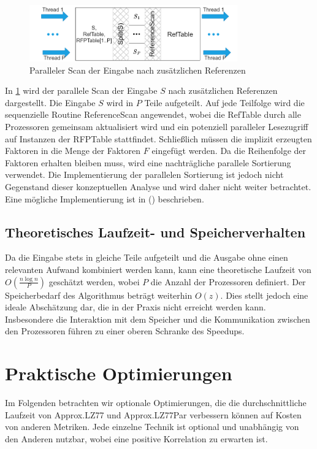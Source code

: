 \begin{figure}[ht]
    \centering
    \includegraphics[width=0.8\textwidth]{Images/parallel_referencescan.png}
    \caption{Paralleler Scan der Eingabe nach zusätzlichen Referenzen}
    \label{fig:parrefscan}
\end{figure}
In \ref{fig:parrefscan} wird der parallele Scan der Eingabe $S$ nach zusätzlichen Referenzen dargestellt. Die Eingabe $S$ wird in $P$ Teile aufgeteilt. Auf jede Teilfolge wird die sequenzielle Routine
ReferenceScan angewendet, wobei die RefTable durch alle Prozessoren gemeinsam aktualisiert wird und ein potenziell paralleler Lesezugriff auf Instanzen der RFPTable stattfindet. 
Schließlich müssen die implizit erzeugten Faktoren in die Menge der Faktoren $F$ eingefügt werden. Da die Reihenfolge der Faktoren erhalten bleiben muss, wird eine nachträgliche parallele Sortierung
verwendet. Die Implementierung der parallelen Sortierung ist jedoch nicht Gegenstand dieser konzeptuellen Analyse und wird daher nicht weiter betrachtet. Eine mögliche Implementierung ist in (\cite{parallelcomputing}) 
beschrieben.

\subsection{Theoretisches Laufzeit- und Speicherverhalten}
Da die Eingabe stets in gleiche Teile aufgeteilt und die Ausgabe ohne einen relevanten Aufwand kombiniert werden kann, kann eine theoretische Laufzeit von $O(\frac{n \log n}{P})$ geschätzt werden, 
wobei $P$ die Anzahl der Prozessoren definiert. Der Speicherbedarf des Algorithmus beträgt weiterhin $O(z)$. Dies stellt jedoch eine
ideale Abschätzung dar, die in der Praxis nicht erreicht werden kann. Insbesondere die Interaktion mit dem Speicher und die Kommunikation zwischen den Prozessoren führen zu einer oberen Schranke
des Speedups.

\section{Praktische Optimierungen} \label{sec:practopt}
Im Folgenden betrachten wir optionale Optimierungen, die die durchschnittliche Laufzeit von Approx.LZ77 und Approx.LZ77Par verbessern können auf Kosten von anderen Metriken. Jede einzelne Technik
ist optional und unabhängig von den Anderen nutzbar, wobei eine positive Korrelation zu erwarten ist.

